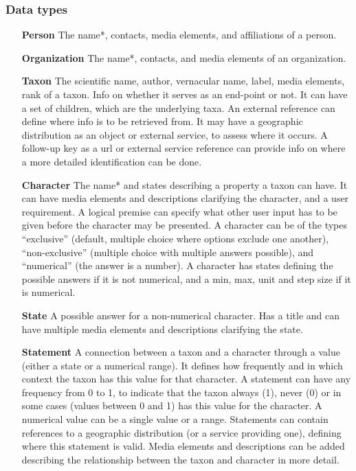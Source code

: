 \documentclass[10pt,letterpaper]{article}
\begin{document}
\subsubsection*{
Data types
}
\begin{itemize}
\item[\textbf{Person}]
The name*, contacts, media elements, and affiliations of a person.
\item[\textbf{Organization}]
The name*, contacts, and media elements of an organization.
\item[\textbf{Taxon}]
The scientific name, author, vernacular name, label, media elements, rank of a taxon. Info on whether it serves as an end-point or not. It can have a set of children, which are the underlying taxa. An external reference can define where info is to be retrieved from. It may have a geographic distribution as an object or external service, to assess where it occurs. A follow-up key as a url or external service reference can provide info on where a more detailed identification can be done.
\item[\textbf{Character}]
The name* and states describing a property a taxon can have. It can have media elements and descriptions clarifying the character, and a user requirement. A logical premise can specify what other user input has to be given before the character may be presented. A character can be of the types ``exclusive'' (default, multiple choice where options exclude one another), ``non-exclusive'' (multiple choice with multiple answers possible), and ``numerical'' (the answer is a number). A character has states defining the possible answers if it is not numerical, and a min, max, unit and step size if it is numerical.
\item[\textbf{State}]
A possible answer for a non-numerical character. Has a title and can have multiple media elements and descriptions clarifying the state. 
\item[\textbf{Statement}]
A connection between a taxon and a character through a value (either a state or a numerical range). It defines how frequently and in which context the taxon has this value for that character. A statement can have any frequency from 0 to 1, to indicate that the taxon always (1), never (0) or in some cases (values between 0 and 1) has this value for the character. A numerical value can be a single value or a range. Statements can contain references to a geographic distribution (or a service providing one), defining where this statement is valid. Media elements and descriptions can be added describing the relationship between the taxon and character in more detail.

\end{itemize}
\end{document}
